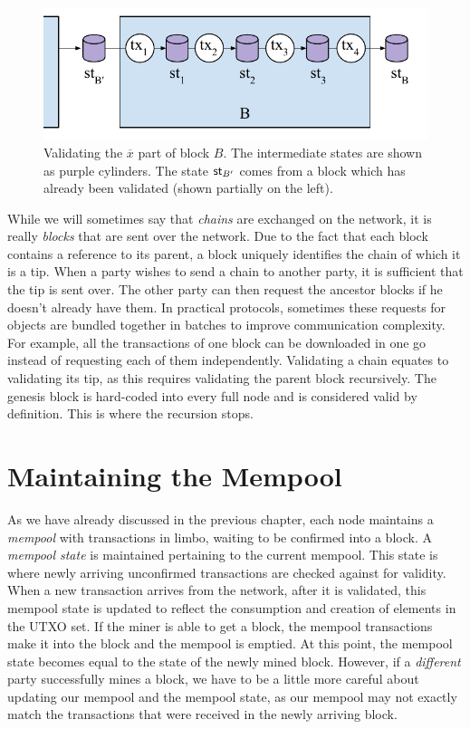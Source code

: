 \begin{figure}[h]
    \centering
    \includegraphics[width=0.7 \columnwidth,keepaspectratio]{figures/block-tx-validation.pdf}
    \caption{Validating the $\overline{x}$ part of block $B$. The intermediate states
             are shown as purple cylinders. The state $\mathsf{st}_{B'}$ comes from a block
             which has already been validated (shown partially on the left).}
    \label{fig.fee}
\end{figure}

While we will sometimes say that \emph{chains} are exchanged on the network, it is really
\emph{blocks} that are sent over the network. Due to the fact that each block contains
a reference to its parent, a block uniquely identifies the chain of which it is a tip.
When a party wishes to send a chain to another party, it is sufficient that the tip is
sent over. The other party can then request the ancestor blocks if he doesn't already
have them.
In practical protocols, sometimes these requests for objects are bundled
together in batches to improve communication complexity. For example, all the transactions
of one block can be downloaded in one go instead of requesting each of them independently.
Validating a chain equates to validating its tip, as this requires validating
the parent block recursively. The genesis block is hard-coded into every full node and is
considered valid by definition. This is where the recursion stops.

\section{Maintaining the Mempool}

As we have already discussed in the previous chapter, each node maintains a \emph{mempool}
with transactions in limbo, waiting to be confirmed into a block. A \emph{mempool state}
is maintained pertaining to the current mempool. This state is where newly arriving unconfirmed
transactions are checked against for validity. When a new transaction arrives from the network,
after it is validated, this mempool state is updated to reflect the consumption and creation
of elements in the UTXO set. If the miner is able to
get a block, the mempool transactions make it into the block and the mempool is emptied.
At this point, the mempool state becomes equal to the state of the newly mined block.
However, if a \emph{different} party successfully mines a block, we have to be a little
more careful about updating our mempool and the mempool state, as our mempool may not exactly
match the transactions that were received in the newly arriving block.

